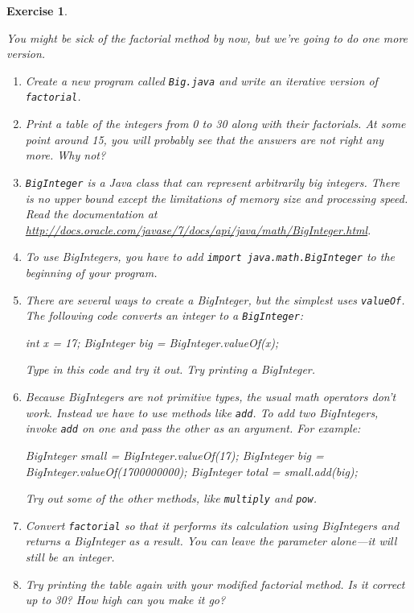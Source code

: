 \documentclass[12pt]{book}
\theoremstyle{exercise}
\newtheorem{exercise}{Exercise}[chapter]
\newcommand{\java}[1]{\verb"#1"}
\newcommand{\java}[1]{\lstinline{#1}} %
\begin{document}
\begin{exercise}
\label{ex.biginteger}

You might be sick of the factorial method by now, but we're going to do one more version.

\begin{enumerate}

\item Create a new program called \java{Big.java} and write an iterative version of \java{factorial}.

\item Print a table of the integers from 0 to 30 along with their factorials.
At some point around 15, you will probably see that the answers are not right any more.
Why not?

\item \java{BigInteger} is a Java class that can represent arbitrarily big integers.
There is no upper bound except the limitations of memory size and processing speed.
Read the documentation at \url{http://docs.oracle.com/javase/7/docs/api/java/math/BigInteger.html}.

\item To use BigIntegers, you have to add \java{import java.math.BigInteger} to the beginning of your program.

\item There are several ways to create a BigInteger, but the simplest uses \java{valueOf}.
The following code converts an integer to a \java{BigInteger}:

\begin{code}
    int x = 17;
    BigInteger big = BigInteger.valueOf(x);
\end{code}

Type in this code and try it out.
Try printing a BigInteger.

\item Because BigIntegers are not primitive types, the usual math operators don't work.
Instead we have to use methods like \java{add}.
To add two BigIntegers, invoke \java{add} on one and pass the other as an argument.
For example:

\begin{code}
    BigInteger small = BigInteger.valueOf(17);
    BigInteger big = BigInteger.valueOf(1700000000);
    BigInteger total = small.add(big);
\end{code}

Try out some of the other methods, like \java{multiply} and \java{pow}.

\item Convert \java{factorial} so that it performs its calculation using BigIntegers and returns a BigInteger as a result.
You can leave the parameter alone---it will still be an integer.

\item Try printing the table again with your modified factorial method.
Is it correct up to 30?
How high can you make it go?

\end{enumerate}
\end{exercise}
\end{document}
